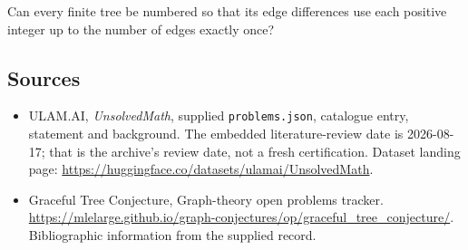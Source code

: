 \documentclass[11pt,a4paper]{article}
\begin{document}
Can every finite tree be numbered so that its edge differences use each positive integer up to the number of edges exactly once?

\subsection{Sources}

{\small

\begin{itemize}

\item[\hypertarget{source:statement:1}{S1}] ULAM.AI, \emph{UnsolvedMath}, supplied \texttt{problems.json}, catalogue entry, statement and background. The embedded literature-review date is 2026-08-17; that is the archive’s review date, not a fresh certification. Dataset landing page: \url{https://huggingface.co/datasets/ulamai/UnsolvedMath}.

\item[\hypertarget{source:statement:2}{S2}] Graceful Tree Conjecture, Graph-theory open problems tracker. \url{https://mlelarge.github.io/graph-conjectures/op/graceful_tree_conjecture/}. Bibliographic information from the supplied record.

\end{itemize}

}

\label{end:statement}
\end{document}
